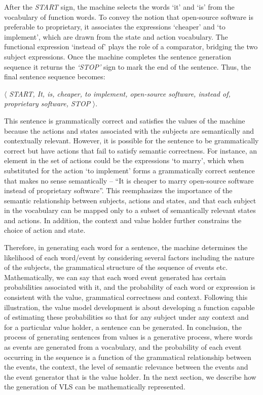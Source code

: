 After the \emph{START} sign, the machine selects the words `it' and `is' from the vocabulary of function words. To convey the notion that open-source software is preferable to proprietary, it associates the expressions `cheaper' and `to implement', which are drawn from the state and action vocabulary. The functional expression `instead of' plays the role of a comparator, bridging the two subject expressions. Once the machine completes the sentence generation sequence it returns the \emph{`STOP'} sign to mark the end of the sentence. Thus, the final sentence sequence becomes:
\begin{center} 
$\langle$ \emph{START, It, is, cheaper, to implement, open-source software, instead of, proprietary software, STOP} $\rangle$.
\end{center} 

\noindent This sentence is grammatically correct and satisfies the values of the machine because the actions and states associated with the subjects are semantically and contextually relevant. However, it is possible for the sentence to be grammatically correct but have actions that fail to satisfy semantic correctness. For instance, an element in the set of actions could be the expressions `to marry', which when substituted for the action `to implement' forms a grammatically correct sentence that makes no sense semantically -- ``It is cheaper to marry open-source software instead of proprietary software''. This reemphasizes the importance of the semantic relationship between subjects, actions and states, and that each subject in the vocabulary can be mapped only to a subset of semantically relevant states and actions.
In addition, the context and value holder further constrains the choice of action and state.


Therefore, in generating each word for a sentence, the machine determines the likelihood of each word/event by considering several factors including the nature of the subjects, the grammatical structure of the sequence of events etc. Mathematically, we can say that each word event generated has certain probabilities associated with it, and the probability of each word or expression is consistent with the value, grammatical correctness and context. Following this illustration, the value model development is about developing a function capable of estimating these probabilities so that for any subject under any context and for a particular value holder, a sentence can be generated. In conclusion, the process of generating sentences from values is a generative process, where words as events are generated from a vocabulary, and the probability of each event occurring in the sequence is a function of the grammatical relationship between the events, the context, the level of semantic relevance between the events and the event generator that is the value holder. In the next section, we describe how the generation of VLS can be mathematically represented.

